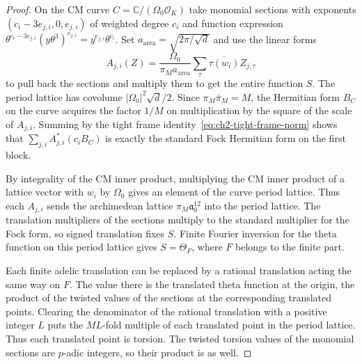 \begin{proof}
On the CM curve $C=\mathbb C/(\Omega_0\mathcal O_K)$ take monomial sections with exponents $(c_i-3e_{j,i},0,e_{j,i})$ of weighted degree $c_i$ and function expression $\theta^{c_i-3e_{j,i}}(y\theta^3)^{e_{j,i}}=y^{e_{j,i}}\theta^{c_i}$. Set $a_{\mathrm{area}}=\sqrt{2\pi/\sqrt d}$ and use the linear forms
\[
 A_{j,i}(Z)=\frac{\Omega_0}{\pi_M a_{\mathrm{area}}}
                \sum_\tau\overline{\tau(w_i)}Z_{j,\tau}
\]
to pull back the sections and multiply them to get the entire function $S$. The period lattice has covolume $|\Omega_0|^2\sqrt d/2$. Since $\pi_M\bar\pi_M=M$, the Hermitian form $B_C$ on the curve acquires the factor $1/M$ on multiplication by the square of the scale of $A_{j,i}$. Summing by the tight frame identity~\eqref{eq:ch2-tight-frame-norm} shows that $\sum_{j,i}A_{j,i}^*(c_i B_C)$ is exactly the standard Fock Hermitian form on the first block.

By integrality of the CM inner product, multiplying the CM inner product of a lattice vector with $w_i$ by $\Omega_0$ gives an element of the curve period lattice. Thus each $A_{j,i}$ sends the archimedean lattice $\pi_M\mathfrak a_0^{12}$ into the period lattice. The translation multipliers of the sections multiply to the standard multiplier for the Fock form, so signed translation fixes $S$. Finite Fourier inversion for the theta function on this period lattice gives $S=\Theta_F$, where $F$ belongs to the finite part.

Each finite adelic translation can be replaced by a rational translation acting the same way on $F$. The value there is the translated theta function at the origin, the product of the twisted values of the sections at the corresponding translated points. Clearing the denominator of the rational translation with a positive integer $L$ puts the $ML$-fold multiple of each translated point in the period lattice. Thus each translated point is torsion. The twisted torsion values of the monomial sections are $p$-adic integers, so their product is as well.


\end{proof}

